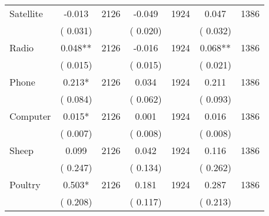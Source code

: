 \begin{tabular}{l*{6}{c}}
Satellite        &             -0.013      &       2126       &             -0.049      &       1924       &              0.047      &       1386       \\
                       &       (       0.031)            &                               &       (       0.020)            &                               &       (       0.032)            &                               \\
Radio        &              0.048**      &       2126       &             -0.016      &       1924       &              0.068**      &       1386       \\
                       &       (       0.015)            &                               &       (       0.015)            &                               &       (       0.021)            &                               \\
Phone        &              0.213*      &       2126       &              0.034      &       1924       &              0.211      &       1386       \\
                       &       (       0.084)            &                               &       (       0.062)            &                               &       (       0.093)            &                               \\
Computer        &              0.015*      &       2126       &              0.001      &       1924       &              0.016      &       1386       \\
                       &       (       0.007)            &                               &       (       0.008)            &                               &       (       0.008)            &                               \\
Sheep        &              0.099      &       2126       &              0.042      &       1924       &              0.116      &       1386       \\
                       &       (       0.247)            &                               &       (       0.134)            &                               &       (       0.262)            &                               \\
Poultry        &              0.503*      &       2126       &              0.181      &       1924       &              0.287      &       1386       \\
                       &       (       0.208)            &                               &       (       0.117)            &                               &       (       0.213)            &                               \\

\end{tabular}
